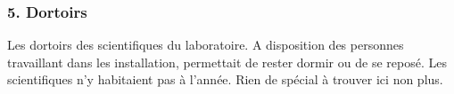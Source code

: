 \subsubsection{5. Dortoirs}
Les dortoirs des scientifiques du laboratoire. A disposition des personnes travaillant dans les installation, permettait de rester dormir ou de se reposé. Les scientifiques n’y habitaient pas à l’année. Rien de spécial à trouver ici non plus.




\onecolumn
